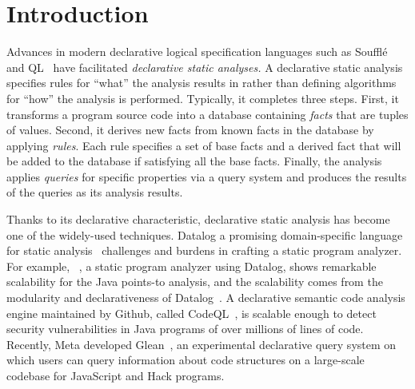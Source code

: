 \section{Introduction}
Advances in modern declarative logical specification languages such as
 Souffl\'{e}~\cite{souffle} and QL~\cite{ql2016} have facilitated
\emph{declarative static analyses.} A declarative static analysis specifies
rules for ``what'' the analysis results in rather than defining algorithms for
``how'' the analysis is performed.  Typically, it completes three steps.
First, it transforms a program source code into a database containing
\textit{facts} that are tuples of values.  Second, it derives new facts from
known facts in the database by applying {\it rules}.  Each rule specifies a set
of base facts and a derived fact that will be added to the database if
satisfying all the base facts.  Finally, the analysis applies {\it queries} for
specific properties via a query system and produces the results of the queries
as its analysis results.

Thanks to its declarative characteristic, declarative static analysis has
become one of the widely-used techniques.  Datalog  a promising
domain-specific language for static analysis~\cite{doop, codequest, allen2015D,
allen2015stagedD, alpuente2010D, dawson1996D, naik2006D, reps1994D,
smaragdakis2014D, whaley2005D, scholz2016}  challenges and
burdens in crafting a static program analyzer.  For example, \doop~\cite{doop},
a static program analyzer using Datalog, shows remarkable scalability for the
Java points-to analysis, and the scalability comes from the modularity and
declarativeness of Datalog~\cite{doopWorkshop}.
 A declarative semantic code
analysis engine maintained by Github, called CodeQL~\cite{codeql}, is scalable
enough to detect security vulnerabilities in Java programs of over millions of
lines of code.  Recently, Meta developed Glean~\cite{glean}, an experimental
declarative query system on which users can query information about code
structures on a large-scale codebase for JavaScript and Hack programs.

